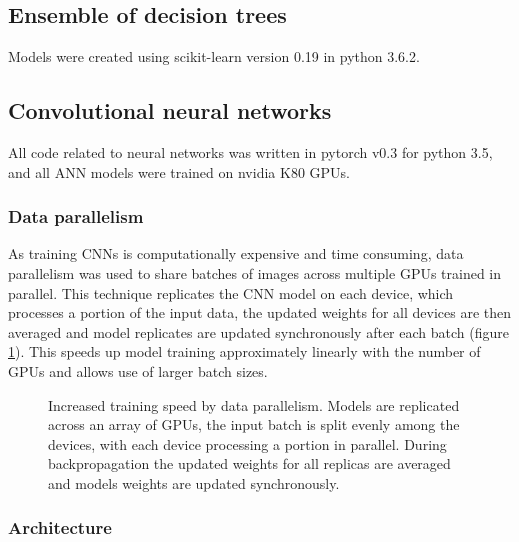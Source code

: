 \documentclass[a4paper,11pt,twoside,openright]{scrbook}
\begin{document}
\subsection{Ensemble of decision trees}
Models were created using scikit-learn version 0.19 in python 3.6.2.

\subsection{Convolutional neural networks}


All code related to neural networks was written in pytorch v0.3 for python 3.5, and all ANN models were trained on nvidia K80 GPUs.

\subsubsection{Data parallelism}
As training CNNs is computationally expensive and time consuming, data parallelism was used to share batches of images across multiple GPUs trained in parallel.
This technique replicates the CNN model on each device, which processes a portion of the input data, the updated weights for all devices are then averaged and model replicates are updated synchronously after each batch (figure \ref{figure:multi_GPU}).
This speeds up model training approximately linearly with the number of GPUs and allows use of larger batch sizes.

\begin{figure}
    \captionsetup{width=0.8\textwidth}
    \caption[Multi-GPU distributed training]{Increased training speed by data parallelism. Models are replicated across an array of GPUs, the input batch is split evenly among the devices, with each device processing a portion in parallel.
During backpropagation the updated weights for all replicas are averaged and models weights are updated synchronously.}
    
    \label{figure:multi_GPU}
\end{figure}

\subsubsection{Architecture}
\end{document}
